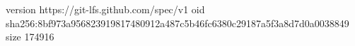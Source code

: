 version https://git-lfs.github.com/spec/v1
oid sha256:8bf973a956823919817480912a487c5b46fc6380c29187a5f3a8d7d0a0038849
size 174916
